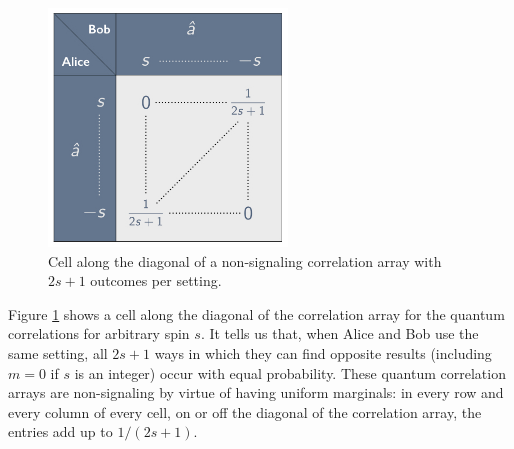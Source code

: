 \begin{figure}[ht]
 \centering
   \includegraphics[width=2.5in]{diag-cell-sxs.jpeg} 
   \caption{Cell along the diagonal of a non-signaling correlation array with $2s+1$ outcomes per setting.}
   \label{diag-cell-sxs}
\end{figure}

Figure \ref{diag-cell-sxs} shows a cell along the diagonal of the correlation array for the quantum correlations for arbitrary spin $s$. It tells us that, when Alice and Bob use the same setting, all $2s \! + \! 1$ ways in which they can find opposite results (including $m = 0$ if $s$ is an integer) occur with equal probability. These quantum correlation arrays are non-signaling by virtue of having uniform marginals: in every row and every column of every cell, on or off the diagonal of the correlation array, the entries add up to $1/(2s \! + \! 1)$. 

